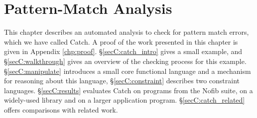 
\begin{comment}
\h{.*}\begin{code}
import Prelude hiding (map, (||))
import Data.Array
import Data.Maybe
import System.Environment
import Data.Char
import Data.List hiding (map)

infixr 2  ||

data Expr = EVar String
          | ECon String [Expr]
          | EFun String [Expr]
          | EApp Expr [Expr]
          | ELam String Expr
          | ELet String Expr Expr
          | ECase Expr [Alt]

data Alt = EAlt String [String] Expr

type FuncName = String
type CtorName = String
type VarName = String

body   :: FuncName  -> Expr
args   :: FuncName  -> [VarName]
rhs    :: Alt       -> Expr
arity  :: String    -> Int
ctors  :: CtorName  -> [CtorName]

ellipses :: a

instance Eq a => Eq (Prop a)
\end{code}
\h{.mp}\begin{code}
instance Eq Val
\end{code}
\end{comment}


\newcommand{\rec}[1]{\hspace{-0.75ex}_{#1}}


\newcommand{\para}[1]{\vspace{2mm}\noindent\textbf{#1}}


\chapter{Pattern-Match Analysis}
\label{chp:catch}


This chapter describes an automated analysis to check for pattern match errors, which we have called Catch. A proof of the work presented in this chapter is given in Appendix \ref{chp:proof}. \S\ref{secC:catch_intro} gives a small example, and \S\ref{secC:walkthrough} gives an overview of the checking process for this example. \S\ref{secC:manipulate} introduces a small core functional language and a mechanism for reasoning about this language, \S\ref{secC:constraint} describes two constraint languages. \S\ref{secC:results} evaluates Catch on programs from the Nofib suite, on a widely-used library and on a larger application program. \S\ref{secC:catch_related} offers comparisons with related work.


